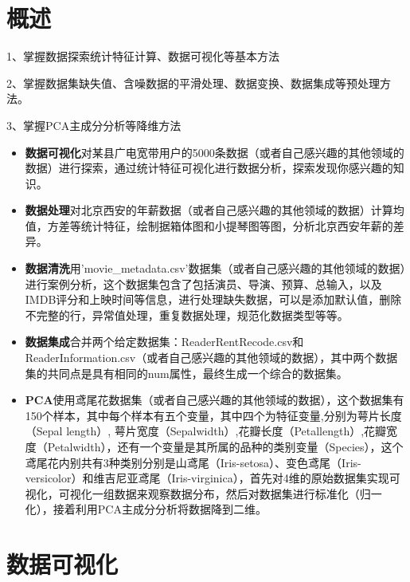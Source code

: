 \documentclass[a4paper]{article}
\begin{document}
\section{概述} \label{overview}%

1、掌握数据探索统计特征计算、数据可视化等基本方法

2、掌握数据集缺失值、含噪数据的平滑处理、数据变换、数据集成等预处理方法。

3、掌握PCA主成分分析等降维方法

\begin{itemize}
	\item{\textbf{数据可视化}对某县广电宽带用户的5000条数据（或者自己感兴趣的其他领域的数据）进行探索，通过统计特征可视化进行数据分析，探索发现你感兴趣的知识。}
    \item{\textbf{数据处理}对北京西安的年薪数据（或者自己感兴趣的其他领域的数据）计算均值，方差等统计特征，绘制据箱体图和小提琴图等图，分析北京西安年薪的差异。}
    \item{\textbf{数据清洗}用'movie\_metadata.csv'数据集（或者自己感兴趣的其他领域的数据）进行案例分析，这个数据集包含了包括演员、导演、预算、总输入，以及IMDB评分和上映时间等信息，进行处理缺失数据，可以是添加默认值，删除不完整的行，异常值处理，重复数据处理，规范化数据类型等等。
    }
    \item{\textbf{数据集成}合并两个给定数据集：ReaderRentRecode.csv和ReaderInformation.csv（或者自己感兴趣的其他领域的数据），其中两个数据集的共同点是具有相同的num属性，最终生成一个综合的数据集。
    }
    \item{\textbf{PCA}使用鸢尾花数据集（或者自己感兴趣的其他领域的数据），这个数据集有150个样本，其中每个样本有五个变量，其中四个为特征变量,分别为萼片长度（Sepal length）, 萼片宽度（Sepalwidth）,花瓣长度（Petallength）,花瓣宽度（Petalwidth），还有一个变量是其所属的品种的类别变量（Species），这个鸢尾花内别共有3种类别分别是山鸢尾（Iris-setosa）、变色鸢尾（Iris-versicolor）和维吉尼亚鸢尾（Iris-virginica），首先对4维的原始数据集实现可视化，可视化一组数据来观察数据分布，然后对数据集进行标准化（归一化），接着利用PCA主成分分析将数据降到二维。}
\end{itemize}


\newpage
\section{数据可视化}\label{sub:ptx}
\end{document}
